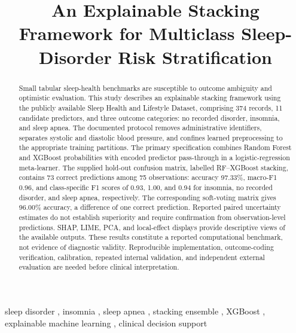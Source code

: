 \documentclass[a4paper,fleqn]{cas-dc}
\newcommand{\anonymousauthorspacer}{\rule{0pt}{16mm}}
\begin{document}
\raggedbottom
\shorttitle{}
\shortauthors{}
\title[mode=title]{An Explainable Stacking Framework for Multiclass Sleep-Disorder Risk Stratification}
\author{\anonymousauthorspacer}
\begin{abstract}
Small tabular sleep-health benchmarks are susceptible to outcome ambiguity and optimistic evaluation. This study describes an explainable stacking framework using the publicly available Sleep Health and Lifestyle Dataset, comprising 374 records, 11 candidate predictors, and three outcome categories: no recorded disorder, insomnia, and sleep apnea. The documented protocol removes administrative identifiers, separates systolic and diastolic blood pressure, and confines learned preprocessing to the appropriate training partitions. The primary specification combines Random Forest and XGBoost probabilities with encoded predictor pass-through in a logistic-regression meta-learner. The supplied hold-out confusion matrix, labelled RF--XGBoost stacking, contains 73 correct predictions among 75 observations: accuracy 97.33\%, macro-F1 0.96, and class-specific F1 scores of 0.93, 1.00, and 0.94 for insomnia, no recorded disorder, and sleep apnea, respectively. The corresponding soft-voting matrix gives 96.00\% accuracy, a difference of one correct prediction. Reported paired uncertainty estimates do not establish superiority and require confirmation from observation-level predictions. SHAP, LIME, PCA, and local-effect displays provide descriptive views of the available outputs. These results constitute a reported computational benchmark, not evidence of diagnostic validity. Reproducible implementation, outcome-coding verification, calibration, repeated internal validation, and independent external evaluation are needed before clinical interpretation.
\end{abstract}
\begin{keywords}
sleep disorder \sep
insomnia \sep
sleep apnea \sep
stacking ensemble \sep
XGBoost \sep
explainable machine learning \sep
clinical decision support
\end{keywords}
\end{document}

